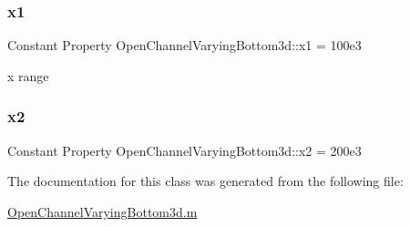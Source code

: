 \mbox{\label{class_open_channel_varying_bottom3d_a7f614d84cef81b7f55dcec4167216b29}} 
\subsubsection{\texorpdfstring{x1}{x1}}
{\footnotesize\ttfamily Constant Property Open\+Channel\+Varying\+Bottom3d\+::x1 = 100e3}



x range 

\mbox{\label{class_open_channel_varying_bottom3d_a8a6e290d11b4160812d5dc4cd4d2be6f}} 
\subsubsection{\texorpdfstring{x2}{x2}}
{\footnotesize\ttfamily Constant Property Open\+Channel\+Varying\+Bottom3d\+::x2 = 200e3}



The documentation for this class was generated from the following file\+:\begin{DoxyCompactItemize}
\item 
\hyperlink{_open_channel_varying_bottom3d_8m}{Open\+Channel\+Varying\+Bottom3d.\+m}\end{DoxyCompactItemize}
